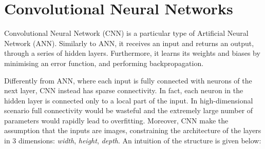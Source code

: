 

\section{Convolutional Neural Networks}
Convolutional Neural Network (CNN) is a particular type of Artificial Neural Network (ANN). Similarly to ANN, it receives an input and returns an output, through a series of hidden layers. Furthermore, it learns its weights and biases by minimising an error function, and performing backpropagation. 

Differently from ANN, where each input is fully connected with neurons of the next layer, CNN instead has sparse connectivity. In fact, each neuron in the hidden layer is connected only to a local part of the input. In high-dimensional scenario full connectivity would be wasteful and the extremely large number of parameters would rapidly lead to overfitting. Moreover, CNN make the assumption that the inputs are images, constraining the architecture of the layers in 3 dimensions: \textit{width}, \textit{height}, \textit{depth}. An intuition of the structure is given below:

